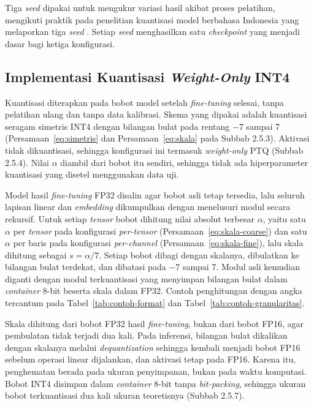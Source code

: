 Tiga \textit{seed} dipakai untuk mengukur variasi hasil akibat proses pelatihan, mengikuti praktik pada penelitian kuantisasi model berbahasa Indonesia yang melaporkan tiga \textit{seed} \parencite{sanjaya2026quantization}. Setiap \textit{seed} menghasilkan satu \textit{checkpoint} yang menjadi dasar bagi ketiga konfigurasi.

\subsection{Implementasi Kuantisasi \textit{Weight-Only} INT4}

Kuantisasi diterapkan pada bobot model setelah \textit{fine-tuning} selesai, tanpa pelatihan ulang dan tanpa data kalibrasi. Skema yang dipakai adalah kuantisasi seragam simetris INT4 dengan bilangan bulat pada rentang $-7$ sampai 7 (Persamaan~\ref{eq:simetris} dan Persamaan~\ref{eq:skala} pada Subbab 2.5.3). Aktivasi tidak dikuantisasi, sehingga konfigurasi ini termasuk \textit{weight-only} PTQ (Subbab 2.5.4). Nilai $\alpha$ diambil dari bobot itu sendiri, sehingga tidak ada hiperparameter kuantisasi yang disetel menggunakan data uji.

Model hasil \textit{fine-tuning} FP32 disalin agar bobot asli tetap tersedia, lalu seluruh lapisan linear dan \textit{embedding} dikumpulkan dengan menelusuri modul secara rekursif. Untuk setiap \textit{tensor} bobot dihitung nilai absolut terbesar $\alpha$, yaitu satu $\alpha$ per \textit{tensor} pada konfigurasi \textit{per-tensor} (Persamaan~\ref{eq:skala-coarse}) dan satu $\alpha$ per baris pada konfigurasi \textit{per-channel} (Persamaan~\ref{eq:skala-fine}), lalu skala dihitung sebagai $s = \alpha / 7$. Setiap bobot dibagi dengan skalanya, dibulatkan ke bilangan bulat terdekat, dan dibatasi pada $-7$ sampai 7. Modul asli kemudian diganti dengan modul terkuantisasi yang menyimpan bilangan bulat dalam \textit{container} 8-bit beserta skala dalam FP32. Contoh penghitungan dengan angka tercantum pada Tabel~\ref{tab:contoh-format} dan Tabel~\ref{tab:contoh-granularitas}.

Skala dihitung dari bobot FP32 hasil \textit{fine-tuning}, bukan dari bobot FP16, agar pembulatan tidak terjadi dua kali. Pada inferensi, bilangan bulat dikalikan dengan skalanya melalui \textit{dequantization} sehingga kembali menjadi bobot FP16 sebelum operasi linear dijalankan, dan aktivasi tetap pada FP16. Karena itu, penghematan berada pada ukuran penyimpanan, bukan pada waktu komputasi. Bobot INT4 disimpan dalam \textit{container} 8-bit tanpa \textit{bit-packing}, sehingga ukuran bobot terkuantisasi dua kali ukuran teoretisnya (Subbab 2.5.7).

